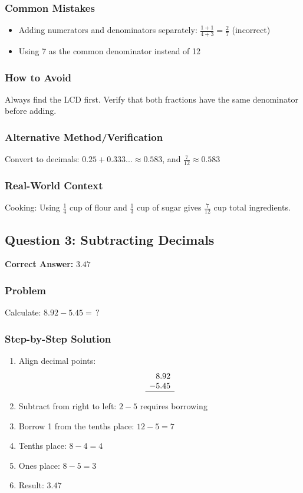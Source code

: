 \documentclass[12pt,a4paper]{article}
\begin{document}
\subsubsection*{Common Mistakes}
\begin{itemize}
    \item Adding numerators and denominators separately: $\frac{1+1}{4+3} = \frac{2}{7}$ (incorrect)
    \item Using 7 as the common denominator instead of 12
\end{itemize}

\subsubsection*{How to Avoid}
Always find the LCD first. Verify that both fractions have the same denominator before adding.

\subsubsection*{Alternative Method/Verification}
Convert to decimals: $0.25 + 0.333... \approx 0.583$, and $\frac{7}{12} \approx 0.583$ 

\subsubsection*{Real-World Context}
Cooking: Using $\frac{1}{4}$ cup of flour and $\frac{1}{3}$ cup of sugar gives $\frac{7}{12}$ cup total ingredients.

\vspace{0.5cm}

\subsection*{Question 3: Subtracting Decimals}

\textbf{Correct Answer:} $3.47$

\subsubsection*{Problem}
Calculate: $8.92 - 5.45 = \,?$

\subsubsection*{Step-by-Step Solution}
\begin{enumerate}
    \item Align decimal points:
    \[\begin{array}{r}
        8.92 \\
        -5.45 \\
        \hline
    \end{array}\]
    \item Subtract from right to left: $2 - 5$ requires borrowing
    \item Borrow 1 from the tenths place: $12 - 5 = 7$
    \item Tenths place: $8 - 4 = 4$
    \item Ones place: $8 - 5 = 3$
    \item Result: $3.47$
\end{enumerate}
\end{document}
